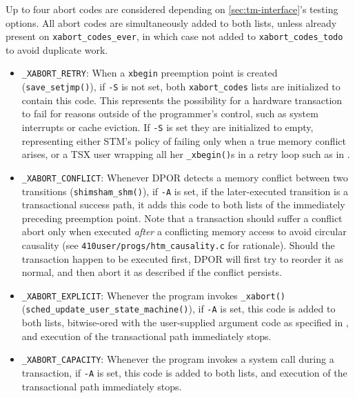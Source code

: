 Up to four abort codes are considered depending on \cref{sec:tm-interface}'s testing options.
All abort codes are simultaneously added to both lists,
unless already present on {\tt xabort\_codes\_ever},
in which case not added to {\tt xabort\_codes\_todo} to avoid duplicate work.
\begin{itemize}
	\item {\tt \_XABORT\_RETRY}:
		When a {\tt xbegin} preemption point is created ({\tt save\_setjmp()}),
		if {\tt -S} is not set,
		both {\tt xabort\_codes} lists are initialized to contain this code.
		This represents the possibility for a hardware transaction to fail
		for reasons outside of the programmer's control, such as system interrupts or cache eviction.
		If {\tt -S} is set they are initialized to empty,
		representing either STM's policy of failing only when a true memory conflict arises,
		or a TSX user wrapping all her {\tt \_xbegin()}s in a retry loop such as in \cite{sigbovik-htm}.
	\item {\tt \_XABORT\_CONFLICT}:
		Whenever DPOR detects a memory conflict between two transitions ({\tt shimsham\_shm()}),
		if {\tt -A} is set,
		if the later-executed transition is a transactional success path,
		it adds this code to both lists of the immediately preceding preemption point.
		Note that a transaction should suffer a conflict abort
		only when executed {\em after} a conflicting memory access
		to avoid circular causality
		(see {\tt 410user/progs/htm\_causality.c} for rationale).
		Should the transaction happen to be executed first,
		DPOR will first try to reorder it as normal,
		and then abort it as described if the conflict persists.
	\item {\tt \_XABORT\_EXPLICIT}:
		Whenever the program invokes {\tt \_xabort()} ({\tt sched\_update\_user\_\allowbreak{}state\_machine()}),
		if {\tt -A} is set,
		this code is added to both lists, bitwise-ored with the user-supplied argument code
		as specified in \cite{htm-gcc},
		and execution of the transactional path immediately stops.
	\item {\tt \_XABORT\_CAPACITY}:
		Whenever the program invokes a system call during a transaction,
		if {\tt -A} is set,
		this code is added to both lists,
		and execution of the transactional path immediately stops.
\end{itemize}

